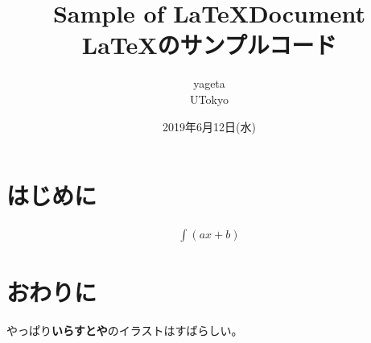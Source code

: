 \documentclass[uplatex, twocolumn,10pt]{jsarticle}
\begin{document}
\title{\bf{\LARGE{Sample of \LaTeX  Document} \\ \Large{\LaTeX のサンプルコード}}}
\author{yageta\\UTokyo}
\date{2019年6月12日(水)}
\maketitle


\section{はじめに}

\begin{align*}
    \int (ax + b)
\end{align*}



\section{おわりに}
やっぱり{\bf いらすとや}のイラストはすばらしい。
\end{document}
